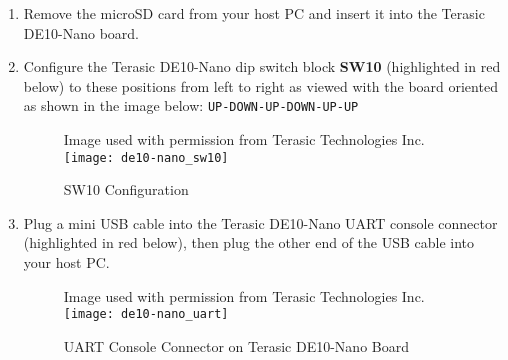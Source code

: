 \begin{flushleft}
\begin{enumerate}[
	label=\textbf{Step \arabic*.},
	leftmargin=*,
	widest={00},
	align=left]
\begin{verbatim}

# create a directory in +\$+DE10_NANO to use as a mount point
+\$+ mkdir sdcard

# mount partition 1 of the microSD card, this is the FAT partition
+\$+ sudo mount +\textcolor{red}{/dev/sdx}+1 sdcard

# copy the required files onto the FAT partition
+\$+ sudo cp +\$+DE10_NANO/blink/output_files/blink.rbf sdcard/
+\$+ sudo cp +\$+DE10_NANO/blink/qsys_headers/hps_0_arm_a9_0.h sdcard/
+\$+ sudo cp +\$+DE10_NANO/devmem.c sdcard/
+\$+ sudo cp +\$+DE10_NANO/devmem2.c sdcard/
+\$+ sudo cp +\$+DE10_NANO/linux_examples.zip sdcard/

# unmount the FAT partition
+\$+ sudo umount sdcard
+\$+ sudo sync

\end{verbatim}

\item Remove the microSD card from your host PC and insert it into the Terasic DE10-Nano board.

\item Configure the Terasic DE10-Nano dip switch block \textbf{SW10} (highlighted in red below) to these positions from left to right as viewed with the board oriented as shown in the image below: \texttt{UP-DOWN-UP-DOWN-UP-UP}

\begin{figure}[H]
\centering
\scriptsize{Image used with permission from Terasic Technologies Inc.}
\newline
\texttt{[image: de10-nano\_sw10]}
\caption{SW10 Configuration}
\label{fig:de10-nano_sw10}
\end{figure}

\item Plug a mini USB cable into the Terasic DE10-Nano UART console connector (highlighted in red below),  then plug the other end of the USB cable into your host PC.

\begin{figure}[H]
\centering
\scriptsize{Image used with permission from Terasic Technologies Inc.}
\newline
\texttt{[image: de10-nano\_uart]}
\caption{UART Console Connector on Terasic DE10-Nano Board}
\label{fig:de10-nano_uart}
\end{figure}


\end{enumerate}
\end{flushleft}
